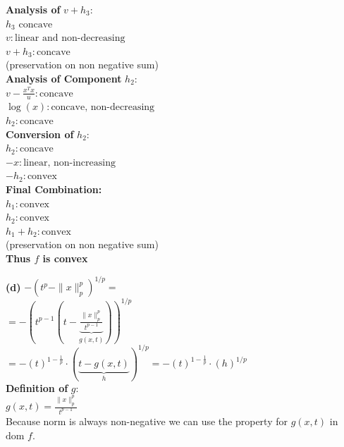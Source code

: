 \documentclass{article}
\begin{document}
\noindent \textbf{Analysis of } $v + h_3$: \\
\indent $h_3 \text{ concave}$ \\
\indent $v : \text{linear and non-decreasing}$ \\
\indent $v + h_3 : \text{concave}$ \\
\indent (preservation on non negative sum) \\[1.5em]

\noindent \textbf{Analysis of Component } $h_2$: \\
\indent $v - \frac{x^Tx}{u} : \text{concave}$ \\
\indent $\log(x) : \text{concave, non-decreasing}$ \\
\indent $h_2 : \text{concave}$ \\[1.5em]

\noindent \textbf{Conversion of } $h_2$: \\
\indent $h_2 : \text{concave}$ \\
\indent $-x : \text{linear, non-increasing}$ \\
\indent $-h_2 : \text{convex}$ \\[1.5em]

\noindent \textbf{Final Combination:} \\
\indent $h_1 : \text{convex}$ \\
\indent $h_2 : \text{convex}$ \\
\indent $h_1 + h_2 : \text{convex}$ \\
\indent (preservation on non negative sum) \\[2em]

\noindent \textbf{Thus $f$ is convex}




\textbf{(d)} \noindent $-\left(t^p - \|x\|_p^p\right)^{1/p} =$ \\[1.5em]

\noindent $= -\left( t^{p-1} \left( t - \underbrace{\frac{\|x\|_p^p}{t^{p-1}}}_{g(x,t)} \right) \right)^{1/p}$ \\[1.5em]

\noindent $= -(t)^{1 - \frac{1}{p}} \cdot (\underbrace{t - g(x,t)}_{h})^{1/p} = -(t)^{1 - \frac{1}{p}} \cdot (h)^{1/p}$ \\[2em]

\noindent \textbf{Definition of } $g$: \\
\indent $g(x,t) = \frac{\|x\|_p^p}{t^{p-1}}$ \\
\indent Because norm is always non-negative we can use the property for $g(x,t)$ in $\text{dom } f$. \\[1.5em]
\end{document}
